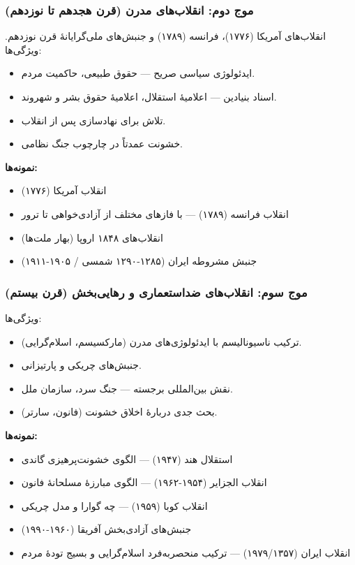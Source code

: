 \subsubsection*{موج دوم: انقلاب‌های مدرن (قرن هجدهم تا نوزدهم)}

انقلاب‌های آمریکا (۱۷۷۶)، فرانسه (۱۷۸۹) و جنبش‌های ملی‌گرایانهٔ قرن 
نوزدهم. ویژگی‌ها:

\begin{itemize}
\item ایدئولوژی سیاسی صریح — حقوق طبیعی، حاکمیت مردم.
\item اسناد بنیادین — اعلامیهٔ استقلال، اعلامیهٔ حقوق بشر و شهروند.
\item تلاش برای نهادسازی پس از انقلاب.
\item خشونت عمدتاً در چارچوب جنگ نظامی.
\end{itemize}

\textbf{نمونه‌ها:}
\begin{itemize}
\item انقلاب آمریکا (۱۷۷۶)
\item انقلاب فرانسه (۱۷۸۹) — با فازهای مختلف از آزادی‌خواهی تا ترور
\item انقلاب‌های ۱۸۴۸ اروپا (بهار ملت‌ها)
\item جنبش مشروطه ایران (۱۲۸۵-۱۲۹۰ شمسی / ۱۹۰۵-۱۹۱۱)
\end{itemize}

\subsubsection*{موج سوم: انقلاب‌های ضداستعماری و رهایی‌بخش (قرن بیستم)}

ویژگی‌ها:
\begin{itemize}
\item ترکیب ناسیونالیسم با ایدئولوژی‌های مدرن (مارکسیسم، اسلام‌گرایی).
\item جنبش‌های چریکی و پارتیزانی.
\item نقش بین‌المللی برجسته — جنگ سرد، سازمان ملل.
\item بحث جدی دربارهٔ اخلاق خشونت (فانون، سارتر).
\end{itemize}

\textbf{نمونه‌ها:}
\begin{itemize}
\item استقلال هند (۱۹۴۷) — الگوی خشونت‌پرهیزی گاندی
\item انقلاب الجزایر (۱۹۵۴-۱۹۶۲) — الگوی مبارزهٔ مسلحانهٔ فانون
\item انقلاب کوبا (۱۹۵۹) — چه گوارا و مدل چریکی
\item جنبش‌های آزادی‌بخش آفریقا (۱۹۶۰-۱۹۹۰)
\item انقلاب ایران (۱۹۷۹/۱۳۵۷) — ترکیب منحصربه‌فرد اسلام‌گرایی و بسیج 
تودهٔ مردم
\end{itemize}

